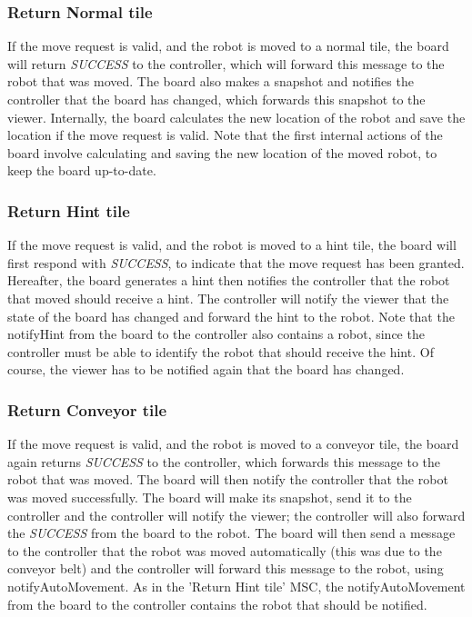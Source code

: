 	\subsubsection{Return Normal tile}
	\begin{minipage}{\linewidth}
		If the move request is valid, and the robot is moved to a normal tile, the board will return \emph{SUCCESS} to the controller, which will forward this message to the robot that was moved. The board also makes a snapshot and notifies the controller that the board has changed, which forwards this snapshot to the viewer. Internally, the board calculates the new location of the robot and save the location if the move request is valid. Note that the first internal actions of the board involve calculating and saving the new location of the moved robot, to keep the board up-to-date.

		
	\end{minipage}

	\subsubsection{Return Hint tile}
	\begin{minipage}{\linewidth}
		If the move request is valid, and the robot is moved to a hint tile, the board will first respond with \emph{SUCCESS}, to indicate that the move request has been granted. Hereafter, the board generates a hint then notifies the controller that the robot that moved should receive a hint. The controller will notify the viewer that the state of the board has changed and forward the hint to the robot. Note that the notifyHint from the board to the controller also contains a robot, since the controller must be able to identify the robot that should receive the hint. Of course, the viewer has to be notified again that the board has changed.

		
	\end{minipage}

	\subsubsection{Return Conveyor tile}
	\begin{minipage}{\linewidth}
		If the move request is valid, and the robot is moved to a conveyor tile, the board again returns \emph{SUCCESS} to the controller, which forwards this message to the robot that was moved. The board will then notify the controller that the robot was moved successfully. The board will make its snapshot, send it to the controller and the controller will notify the viewer; the controller will also forward the \emph{SUCCESS} from the board to the robot. The board will then send a message to the controller that the robot was moved automatically (this was due to the conveyor belt) and the controller will forward this message to the robot, using notifyAutoMovement. As in the 'Return Hint tile' MSC, the notifyAutoMovement from the board to the controller contains the robot that should be notified.

		
	\end{minipage}

